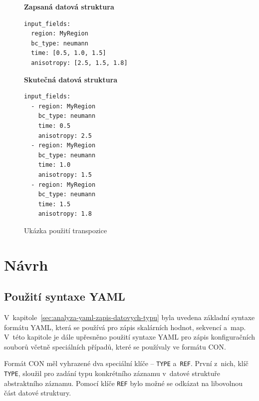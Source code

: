 \documentclass[FM,bw,DP]{tulthesis}
\begin{document}
\begin{figure}[ht]
\singlespacing
\begin{minipage}[t]{0.5\linewidth}
\vspace{0pt}
\textbf{Zapsaná datová struktura}\\
\vspace{-5pt}
\begin{lstlisting}
input_fields: 
  region: MyRegion
  bc_type: neumann
  time: [0.5, 1.0, 1.5]
  anisotropy: [2.5, 1.5, 1.8]
\end{lstlisting}
\end{minipage}
\hfill
\begin{minipage}[t]{0.45\linewidth}
\vspace{0pt}
\textbf{Skutečná datová struktura}\\
\vspace{-5pt}
\begin{lstlisting}
input_fields: 
  - region: MyRegion
    bc_type: neumann
    time: 0.5
    anisotropy: 2.5
  - region: MyRegion
    bc_type: neumann
    time: 1.0
    anisotropy: 1.5
  - region: MyRegion
    bc_type: neumann
    time: 1.5
    anisotropy: 1.8
\end{lstlisting}
\vspace*{-20pt}
\end{minipage}
\onehalfspacing
\caption{Ukázka použití transpozice}
\label{img:transposition_code_example}
\end{figure}

\chapter{Návrh}


\section{Použití syntaxe YAML}

V~kapitole~\ref{sec:analyza-yaml-zapis-datovych-typu} byla uvedena základní syntaxe formátu YAML, která se používá pro zápis skalárních hodnot, sekvencí a~map. V~této kapitole je dále upřesněno použití syntaxe YAML pro zápis konfiguračních souborů včetně speciálních případů, které se používaly ve formátu CON. 

Formát CON měl vyhrazené dva speciální klíče -- \texttt{TYPE} a~\texttt{REF}. První z~nich, klíč \texttt{TYPE}, sloužil pro zadání typu konkrétního záznamu v~datové struktuře abstraktního záznamu. Pomocí klíče \texttt{REF} bylo možné se odkázat na libovolnou část datové struktury.
\end{document}
